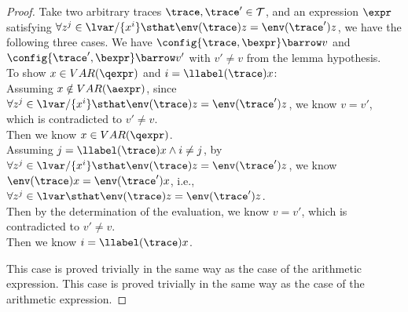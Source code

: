     \begin{proof}
		Take two arbitrary traces $\trace, \trace' \in \mathcal{T}$, and an expression $\expr$ satisfying
		$ \forall z^j \in \lvar / \{x^i\} \sthat  
		\env(\trace) z = \env(\trace') z $, we have the following three cases.
	We have $\config{\trace, \bexpr} \barrow v $ and 
	$\config{\trace', \bexpr} \barrow v' $ with $v' \neq v$ from the lemma hypothesis.
	\\
	To show $x \in VAR(\qexpr)$ and $i = \llabel(\trace) x$: 
	\\
	Assuming $x \notin VAR(\aexpr)$,
	since
	$ \forall z^j \in \lvar / \{x^i\} \sthat  
		\env(\trace) z = \env(\trace') z $,
	we know $v = v'$, which is contradicted to $v' \neq v$.
	\\
	Then we know $x \in VAR(\qexpr)$.
	\\
	Assuming $j = \llabel(\trace) x \land i \neq j$,
	by 
	$ \forall z^j \in \lvar / \{x^i\} \sthat  
		\env(\trace) z = \env(\trace') z $, we know 
		$\env(\trace) x = \env(\trace') x$, i.e., 
	\\
	$\forall z^j \in \lvar \sthat  \env(\trace) z = \env(\trace') z$.
	\\
	Then by the determination of the evaluation, 
	we know $v = v'$, which is contradicted to $v' \neq v$.
	\\
	Then we know $i = \llabel(\trace) x$.

	This case is proved trivially in the same way as the case of the arithmetic expression.
	This case is proved trivially in the same way as the case of the arithmetic expression.
\end{proof}

